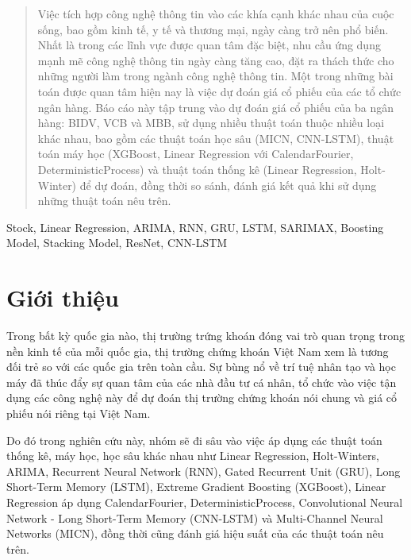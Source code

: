\documentclass[conference]{IEEEtran}
\begin{document}
\maketitle

\begin{abstract}
Việc tích hợp công nghệ thông tin vào các khía cạnh khác nhau của cuộc sống, bao gồm kinh tế, y tế và thương mại, ngày càng trở nên phổ biến. Nhất là trong các lĩnh vực được quan tâm đặc biệt, nhu cầu ứng dụng mạnh mẽ công nghệ thông tin ngày càng tăng cao, đặt ra thách thức cho những người làm trong ngành công nghệ thông tin. Một trong những bài toán được quan tâm hiện nay là việc dự đoán giá cổ phiếu của các tổ chức ngân hàng. Báo cáo này tập trung vào dự đoán giá cổ phiếu của ba ngân hàng: BIDV, VCB và MBB, sử dụng nhiều thuật toán thuộc nhiều loại khác nhau, bao gồm các thuật toán học sâu (MICN, CNN-LSTM), thuật toán máy học (XGBoost, Linear Regression với CalendarFourier, DeterministicProcess) và thuật toán thống kê (Linear Regression, Holt-Winter) để dự đoán, đồng thời so sánh, đánh giá kết quả khi sử dụng những thuật toán nêu trên.
\end{abstract}

\begin{IEEEkeywords}
Stock, Linear Regression, ARIMA, RNN, GRU, LSTM, SARIMAX, Boosting Model, Stacking Model, ResNet, CNN-LSTM
\end{IEEEkeywords}

\section{Giới thiệu}
Trong bất kỳ quốc gia nào, thị trường trứng khoán đóng vai trò quan trọng trong nền kinh tế của mỗi quốc gia, thị trường chứng khoán Việt Nam xem là tương đối trẻ so với các quốc gia trên toàn cầu. Sự bùng nổ về trí tuệ nhân tạo và học máy đã thúc đẩy sự quan tâm của các nhà đầu tư cá nhân, tổ chức vào việc tận dụng các công nghệ này để dự đoán thị trường chứng khoán nói chung và giá cổ phiếu nói riêng tại Việt Nam. 

Do đó trong nghiên cứu này, nhóm sẽ đi sâu vào việc áp dụng các thuật toán thống kê, máy học, học sâu khác nhau như Linear Regression, Holt-Winters, ARIMA, Recurrent Neural Network (RNN), Gated Recurrent Unit (GRU), Long Short-Term Memory (LSTM), Extreme Gradient Boosting (XGBoost), Linear Regression áp dụng CalendarFourier, DeterministicProcess, Convolutional Neural Network - Long Short-Term Memory (CNN-LSTM) và Multi-Channel Neural Networks (MICN), đồng thời cũng đánh giá hiệu suất của các thuật toán nêu trên. 
\end{document}
